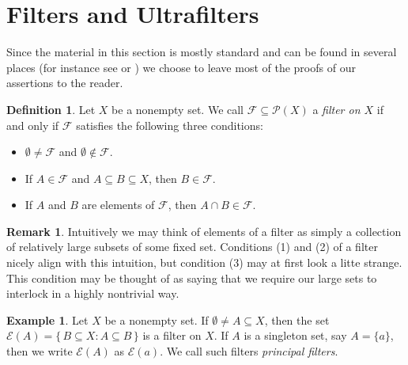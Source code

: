 \documentclass[12pt]{article}
\theoremstyle{plain}
\theoremstyle{definition}
\newtheorem{defn}[thm]{Definition}
\newtheorem{rmk}[thm]{Remark}
\newtheorem{example}[thm]{Example}
\newcommand{\calE}{\mathcal{E}}
\newcommand{\calF}{\mathcal{F}}
\newcommand{\calP}{\mathcal{P}}
\begin{document}
\section{Filters and Ultrafilters}
Since the material in this section is mostly standard and can be found in several places (for instance see \cite[Chapter 5]{Schechter:1997fk} or \cite[Chapter 3]{Hindman:1998fk}) we choose to leave most of the proofs of our assertions to the reader.
\begin{defn}
  \label{defn:filters}
  Let $X$ be a nonempty set.
  We call $\calF \subseteq \calP(X)$ a \textsl{filter on $X$} if and only if $\calF$ satisfies the following three conditions:
  \begin{itemize}
    \item[(1)] $\emptyset \ne \calF$ and $\emptyset \not\in\calF$.
    \item[(2)] If $A \in \calF$ and $A \subseteq B \subseteq X$, then $B \in \calF$.
    \item[(3)] If $A$ and $B$ are elements of $\calF$, then $A \cap B \in \calF$.
  \end{itemize}
\end{defn}
\begin{rmk}
  Intuitively we may think of elements of a filter as simply a collection of relatively large subsets of some fixed set.
  Conditions (1) and (2) of a filter nicely align with this intuition, but condition (3) may at first look a litte strange.
  This condition may be thought of as saying that we require our large sets to interlock in a highly nontrivial way.%
\end{rmk}

\begin{example}
  \label{ex:prinFilt}
  Let $X$ be a nonempty set.
  If $\emptyset \ne A \subseteq X$, then the set $\calE(A) = \{\, B \subseteq X : A \subseteq B \,\}$ is a filter on $X$.
  If $A$ is a singleton set, say $A = \{a\}$, then we write $\calE(A)$ as $\calE(a)$. 
  We call such filters \textsl{principal filters}.
\end{example}
\end{document}
